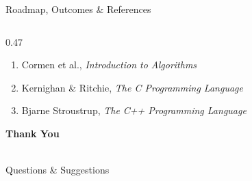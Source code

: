 \documentclass[aspectratio=169,10pt]{beamer}
\begin{document}
\begin{frame}{Roadmap, Outcomes \& References}
\begin{columns}[T]
\begin{column}{0.47\textwidth}
\begin{enumerate}
\item Cormen et al.,
\textit{Introduction to Algorithms}

\item Kernighan \& Ritchie,
\textit{The C Programming Language}

\item Bjarne Stroustrup,
\textit{The C++ Programming Language}

\end{enumerate}

\vfill

\begin{center}

\colorbox{GEUBlue}{
\parbox{0.75\textwidth}{
\centering

\color{white}

\textbf{Thank You}

\\[1mm]

Questions \& Suggestions

}}

\end{center}

\end{column}

\end{columns}

\end{frame}

\end{document}
